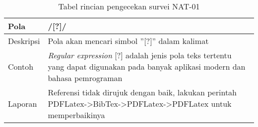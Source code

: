 \begin{enumerate}
	\begin{table}[H]
		\renewcommand{\arraystretch}{1.5}
		\caption {Tabel rincian pengecekan survei NAT-01} 
		\label{tab:nat01}
		\begin{center}
			\begin{tabular}{|p{3.5cm} |p{10.5cm}|}
			\hline 
			Pola & /[?]/ \\ 
			\hline 
			Deskripsi & Pola akan mencari simbol ''[?]'' dalam kalimat \\ 
			\hline 
			Contoh & \textit{Regular expression} [?] adalah jenis pola teks tertentu yang dapat digunakan pada banyak aplikasi modern dan bahasa pemrograman \\ 
			\hline 
			Laporan & Referensi tidak dirujuk dengan baik, lakukan perintah PDFLatex->BibTex->PDFLatex->PDFLatex untuk memperbaikinya\\ 
			\hline
			\end{tabular}
		\end{center}
	\end{table}
	
\end{enumerate}